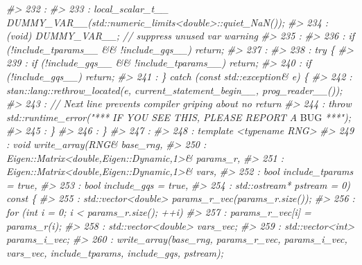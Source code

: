 \documentclass[
  10pt,
  italian,
  a4paper,
  extrafontsizes,onecolumn,openright
  ]{memoir}
\newenvironment{Shaded}{\begin{snugshade}}{\end{snugshade}}
\newcommand{\AlertTok}[1]{\textcolor[rgb]{0.94,0.16,0.16}{#1}}
\newcommand{\CommentTok}[1]{\textcolor[rgb]{0.56,0.35,0.01}{\textit{#1}}}
\begin{document}
\begin{Shaded}
\begin{Highlighting}[]
\CommentTok{\#\textgreater{}  232 : }
\CommentTok{\#\textgreater{}  233 :         local\_scalar\_t\_\_ DUMMY\_VAR\_\_(std::numeric\_limits\textless{}double\textgreater{}::quiet\_NaN());}
\CommentTok{\#\textgreater{}  234 :         (void) DUMMY\_VAR\_\_;  // suppress unused var warning}
\CommentTok{\#\textgreater{}  235 : }
\CommentTok{\#\textgreater{}  236 :         if (!include\_tparams\_\_ \&\& !include\_gqs\_\_) return;}
\CommentTok{\#\textgreater{}  237 : }
\CommentTok{\#\textgreater{}  238 :         try \{}
\CommentTok{\#\textgreater{}  239 :             if (!include\_gqs\_\_ \&\& !include\_tparams\_\_) return;}
\CommentTok{\#\textgreater{}  240 :             if (!include\_gqs\_\_) return;}
\CommentTok{\#\textgreater{}  241 :         \} catch (const std::exception\& e) \{}
\CommentTok{\#\textgreater{}  242 :             stan::lang::rethrow\_located(e, current\_statement\_begin\_\_, prog\_reader\_\_());}
\CommentTok{\#\textgreater{}  243 :             // Next line prevents compiler griping about no return}
\CommentTok{\#\textgreater{}  244 :             throw std::runtime\_error("*** IF YOU SEE THIS, PLEASE REPORT A }\AlertTok{BUG}\CommentTok{ ***");}
\CommentTok{\#\textgreater{}  245 :         \}}
\CommentTok{\#\textgreater{}  246 :     \}}
\CommentTok{\#\textgreater{}  247 : }
\CommentTok{\#\textgreater{}  248 :     template \textless{}typename RNG\textgreater{}}
\CommentTok{\#\textgreater{}  249 :     void write\_array(RNG\& base\_rng,}
\CommentTok{\#\textgreater{}  250 :                      Eigen::Matrix\textless{}double,Eigen::Dynamic,1\textgreater{}\& params\_r,}
\CommentTok{\#\textgreater{}  251 :                      Eigen::Matrix\textless{}double,Eigen::Dynamic,1\textgreater{}\& vars,}
\CommentTok{\#\textgreater{}  252 :                      bool include\_tparams = true,}
\CommentTok{\#\textgreater{}  253 :                      bool include\_gqs = true,}
\CommentTok{\#\textgreater{}  254 :                      std::ostream* pstream = 0) const \{}
\CommentTok{\#\textgreater{}  255 :       std::vector\textless{}double\textgreater{} params\_r\_vec(params\_r.size());}
\CommentTok{\#\textgreater{}  256 :       for (int i = 0; i \textless{} params\_r.size(); ++i)}
\CommentTok{\#\textgreater{}  257 :         params\_r\_vec[i] = params\_r(i);}
\CommentTok{\#\textgreater{}  258 :       std::vector\textless{}double\textgreater{} vars\_vec;}
\CommentTok{\#\textgreater{}  259 :       std::vector\textless{}int\textgreater{} params\_i\_vec;}
\CommentTok{\#\textgreater{}  260 :       write\_array(base\_rng, params\_r\_vec, params\_i\_vec, vars\_vec, include\_tparams, include\_gqs, pstream);}

\end{Highlighting}
\end{Shaded}
\end{document}
